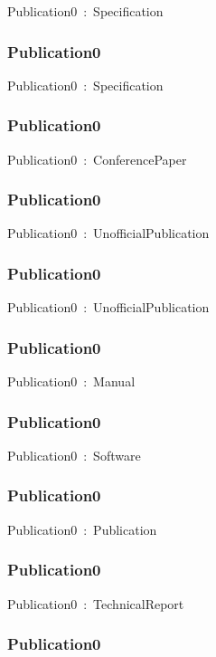 \documentclass{article}
\begin{document}
Publication0~:~Specification

\subsubsection*{Publication0}

Publication0~:~Specification

\subsubsection*{Publication0}

Publication0~:~ConferencePaper

\subsubsection*{Publication0}

Publication0~:~UnofficialPublication

\subsubsection*{Publication0}

Publication0~:~UnofficialPublication

\subsubsection*{Publication0}

Publication0~:~Manual

\subsubsection*{Publication0}

Publication0~:~Software

\subsubsection*{Publication0}

Publication0~:~Publication

\subsubsection*{Publication0}

Publication0~:~TechnicalReport

\subsubsection*{Publication0}
\end{document}
